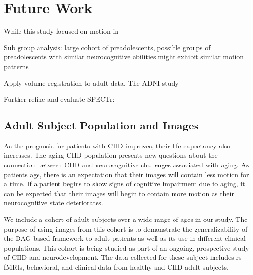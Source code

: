 \section{Future Work}

While this study focused on motion in 

Sub group analysis: large cohort of preadolescents, possible groups of preadolescents with similar neurocognitive abilities might exhibit similar motion patterns

Apply volume registration to adult data. The ADNI study

Further refine and evaluate SPECTr: 

\subsection{Adult Subject Population and Images}

As the prognosis for patients with CHD improves, their life expectancy also increases. The aging CHD population presents new questions about the connection between CHD and neurocognitive challenges associated with aging. As patients age, there is an expectation that their images will contain less motion for a time. If a patient begins to show signs of cognitive impairment due to aging, it can be expected that their images will begin to contain more motion as their neurocognitive state deteriorates. 

We include a cohort of adult subjects over a wide range of ages in our study. The purpose of using images from this cohort is to demonstrate the generalizability of the DAG-based framework to adult patients as well as its use in different clinical populations. This cohort is being studied as part of an ongoing, prospective study of CHD and neurodevelopment. The data collected for these subject includes rs-fMRIs, behavioral, and clinical data from healthy and CHD adult subjects. 
